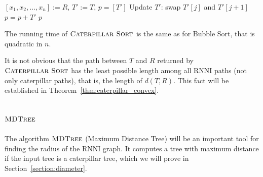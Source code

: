 \documentclass{amsart}
\newcommand{\rnni}{\mathrm{RNNI}}
\newcommand{\csort}{\textsc{Caterpillar Sort}}
\newcommand{\mdtree}{\textsc{MDTree}}
\begin{document}
\begin{algorithm}[H]
\caption{$\csort$($T,R$)}
\label{alg:csort}
\begin{algorithmic}[1]
\STATE $[x_1, x_2, \ldots, x_n] := R$, $T' := T$, $p = [T']$
            \STATE Update $T'$: swap $T'[j]$ and $T'[j+1]$
            \STATE $p = p + T'$
        \ENDIF
    \ENDFOR
\ENDFOR
\RETURN $p$
\end{algorithmic}
\end{algorithm}


The running time of $\csort$ is the same as for Bubble Sort, that is quadratic in $n$.

It is not obvious that the path between $T$ and $R$ returned by $\csort$ has the least possible length among all $\rnni$ paths (not only caterpillar paths), that is, the length of $d(T, R)$.
This fact will be established in Theorem~\ref{thm:caterpillar_convex}.


\subsection{$\mdtree$}
\label{section:alg_mdtree}

The algorithm $\mdtree$ (Maximum Distance Tree) will be an important tool for finding the radius of the $\rnni$ graph.
It computes a tree with maximum distance if the input tree is a caterpillar tree, which we will prove in Section~\ref{section:diameter}.
\end{document}
